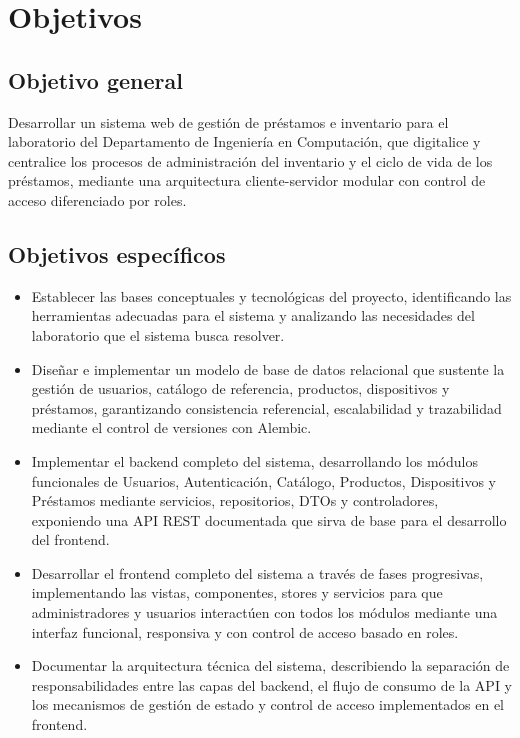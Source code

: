 \section{Objetivos}\label{sec:objetivos_informe_final}

\subsection*{Objetivo general}

Desarrollar un sistema web de gestión de préstamos e inventario para el laboratorio del 
Departamento de Ingeniería en Computación, que digitalice y centralice los procesos de 
administración del inventario y el ciclo de vida de los préstamos, mediante una arquitectura 
cliente-servidor modular con control de acceso diferenciado por roles.

\subsection*{Objetivos específicos}

\begin{itemize}
	\item Establecer las bases conceptuales y tecnológicas del proyecto, identificando las 
	herramientas adecuadas para el sistema y analizando las necesidades del laboratorio 
	que el sistema busca resolver.
	
	\item Diseñar e implementar un modelo de base de datos relacional que sustente la 
	gestión de usuarios, catálogo de referencia, productos, dispositivos y préstamos, 
	garantizando consistencia referencial, escalabilidad y trazabilidad mediante el 
	control de versiones con Alembic.
	
	\item Implementar el backend completo del sistema, desarrollando los módulos funcionales 
	de Usuarios, Autenticación, Catálogo, Productos, Dispositivos y Préstamos mediante 
	servicios, repositorios, DTOs y controladores, exponiendo una API REST documentada 
	que sirva de base para el desarrollo del frontend.
	
	\item Desarrollar el frontend completo del sistema a través de fases progresivas, 
	implementando las vistas, componentes, stores y servicios para que administradores 
	y usuarios interactúen con todos los módulos mediante una interfaz funcional, 
	responsiva y con control de acceso basado en roles.
	
	\item Documentar la arquitectura técnica del sistema, describiendo la separación de 
	responsabilidades entre las capas del backend, el flujo de consumo de la API y los 
	mecanismos de gestión de estado y control de acceso implementados en el frontend.
\end{itemize}